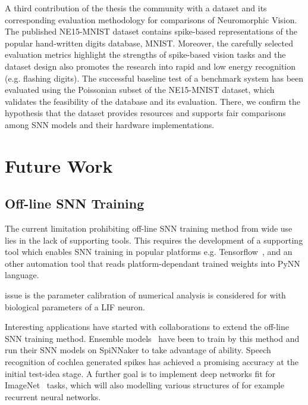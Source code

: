 A third contribution of the thesis \protect{} \protect{} the community with a dataset and its corresponding evaluation methodology for comparisons of Neuromorphic Vision.
The published NE15-MNIST dataset contains \protect{} spike-based representations of the popular hand-written digits database, MNIST.
Moreover, the carefully selected evaluation metrics highlight the strengths of spike-based vision tasks and the dataset design also promotes the research into rapid and low energy recognition (e.g. flashing digits).
The successful baseline test of a benchmark system has been evaluated using the Poissonian subset of the NE15-MNIST dataset, which validates the feasibility of the database and its evaluation.
There, we confirm the hypothesis \protect{} that the dataset provides resources and supports fair comparisons among SNN models and their hardware implementations.




\section{Future Work}
\subsection{Off-line SNN Training}
The current limitation prohibiting \protect{} \protect{} off-line SNN training method from \protect{} wide use lies in the lack of supporting tools.
This requires the development of a supporting tool which enables SNN training in popular \protect{} \protect{} platforms e.g. Tensorflow~\citep{tensorflow2015-whitepaper}, and an other automation tool that reads platform-dependant trained weights into \protect{} PyNN~\citep{davison2008pynn} language.

\protect{}
\protect{} issue is the parameter calibration \protect{} of \protect{} \protect{}
numerical analysis is considered for \protect{} \protect{} with biological parameters of a LIF neuron.

Interesting applications have started with collaborations to extend the off-line SNN training method.
Ensemble models~\citep{rokach2010ensemble} have been \protect{} \protect{} to train by this method and run their SNN models on SpiNNaker to take advantage of \protect{} \protect{} ability.
Speech recognition of cochlea generated spikes has achieved a promising accuracy at the initial test-idea stage.
A further goal is to implement deep networks fit for ImageNet~\citep{deng2009imagenet} tasks, which will also \protect{} \protect{} modelling various structures of \protect{} \protect{} for example recurrent neural networks.


